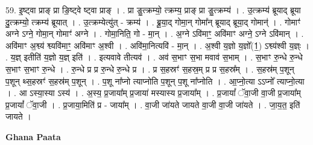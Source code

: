 \documentclass[17pt]{extarticle}
\begin{document}
59. इ॒ष्ट्वा प्राङ् प्रा ङि॒ष्ट्वे ष्ट्वा प्राङ् । . प्रा ङु॒त्क्रम्यो॒ त्क्रम्य॒ प्राङ् प्रा ङु॒त्क्रम्य॑ । . उ॒त्क्रम्य॑ ब्रूयाद् ब्रूया दु॒त्क्रम्यो॒ त्क्रम्य॑ ब्रूयात् । . उ॒त्क्रम्येत्यु॑त् - क्रम्य॑ । . ब्रू॒या॒द् गोमा॒न् गोमा᳚न् ब्रूयाद् ब्रूया॒द् गोमान्॑ । . गोमाꣳ॑ अग्ने ऽग्ने॒ गोमा॒न् गोमाꣳ॑ अग्ने । . गोमा॒निति॒ गो - मा॒न् । . अ॒ग्ने ऽवि॑माꣳ॒॒ अवि॑माꣳ अग्ने॒ ऽग्ने ऽवि॑मान् । . अवि॑माꣳ अ॒श्व्य॑ श्व्यवि॑माꣳ॒॒ अवि॑माꣳ अ॒श्वी । . अवि॑मा॒नित्यवि॑ - मा॒न् । . अ॒श्वी य॒ज्ञो य॒ज्ञो᳚(1॒) ऽश्व्य॑श्वी य॒ज्ञ्ः । . य॒ज्ञ् इतीति॑ य॒ज्ञो य॒ज्ञ् इति॑ । . इत्यवावे तीत्यव॑ । . अव॑ स॒भाꣳ स॒भा मवाव॑ स॒भाम् । . स॒भाꣳ रु॒न्धे रु॒न्धे स॒भाꣳ स॒भाꣳ रु॒न्धे । . रु॒न्धे प्र प्र रु॒न्धे रु॒न्धे प्र । . प्र स॒हस्रꣳ॑ स॒हस्र॒म् प्र प्र स॒हस्र᳚म् । . स॒हस्र॑म् प॒शून् प॒शून् थ्स॒हस्रꣳ॑ स॒हस्र॑म् प॒शून् । . प॒शू ना᳚प्नो त्याप्नोति प॒शून् प॒शू ना᳚प्नोति । . आ॒प्नो॒त्या ऽऽप्नो᳚ त्याप्नो॒त्या । . आ ऽस्या॒स्या ऽस्य॑ । . अ॒स्य॒ प्र॒जाया᳚म् प्र॒जाया॑ मस्यास्य प्र॒जाया᳚म् । . प्र॒जायां᳚ ॅवा॒जी वा॒जी प्र॒जाया᳚म् प्र॒जायां᳚ ॅवा॒जी । . प्र॒जाया॒मिति॑ प्र - जाया᳚म् । . वा॒जी जा॑यते जायते वा॒जी वा॒जी जा॑यते । . जा॒य॒त॒ इति॑ जायते । \newline

\textbf{Ghana Paata } \newline
\end{document}
